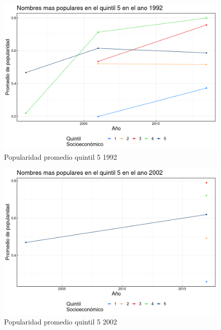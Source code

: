\begin{landscape}
\begin{figure}[H]
\begin{center}
    \includegraphics[width=20cm]{plot/popularidad_1992.png}
    \caption{Popularidad promedio quintil 5 1992}
    \label{fig:popularidad_1992}
\end{center}
\end{figure}
\end{landscape}


\begin{landscape}
\begin{figure}[H]
\begin{center}
    \includegraphics[width=20cm]{plot/popularidad_2002.png}
    \caption{Popularidad promedio quintil 5 2002}
    \label{fig:popularidad_2002}
\end{center}
\end{figure}
\end{landscape}









\printbibliography



